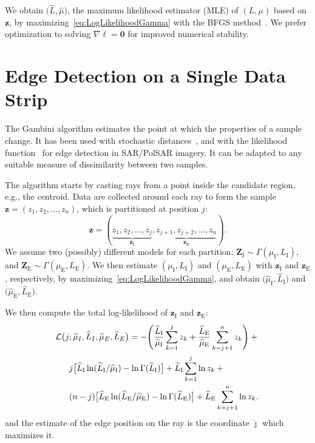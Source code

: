 \documentclass[journal]{IEEEtran}
\begin{document}
We obtain $\big(\widehat L, \widehat \mu\big)$, the maximum likelihood estimator (MLE) of $(L, \mu)$ based on $\bm z$, by maximizing~\eqref{eq:LogLikelihoodGamma} with the BFGS method~\cite{ht}.
We prefer optimization to solving $\nabla\ell=\bm 0$ for improved numerical stability.

\section{Edge Detection on a Single Data Strip}\label{sec_03}

The Gambini algorithm estimates the point at which the properties of a sample change.
It has been used with stochastic distances~\cite{nhfc}, and with the likelihood function~\cite{gmbf, fbgm} for edge detection in SAR/PolSAR imagery.
It can be adapted to any suitable measure of dissimilarity between two samples.

The algorithm starts by casting rays from a point inside the candidate region, e.g., the centroid.
Data are collected around each ray to form the sample $\bm z = (z_1,z_2,\dots,z_n)$, which is partitioned at position $j$:
$$
\bm z = (\underbrace{z_1,z_2,\dots,z_j}_{\bm z_\text{I}}, 
\underbrace{z_{j+1}, z_{j+2},\dots,z_n}_{\bm z_\text{E}}).
$$
We assume two (possibly) different models for each partition:
$\bm Z_\text{I} \sim \Gamma(\mu_\text{I},L_\text{I})$, and 
$\bm Z_\text{E} \sim \Gamma(\mu_\text{E},L_\text{E})$.
We then estimate $(\mu_\text{I},L_\text{I})$ and $(\mu_\text{E},L_\text{E})$ with $\bm z_\text{I}$ and $\bm z_\text{E}$, respectively, by maximizing~\eqref{eq:LogLikelihoodGamma}, and obtain $\big(\widehat{\mu}_\text{I}, \widehat{L}_\text{I}\big)$ and $\big(\widehat{\mu}_\text{E}, \widehat{L}_\text{E}\big)$.

We then compute the total log-likelihood of $\bm z_\text{I}$ and $\bm z_\text{E}$:
\begin{equation}\label{eq:TotalLogLikelihood}
\begin{aligned}
\mathcal L\big(j&;\widehat{\mu}_I, \widehat{L}_I,\widehat{\mu}_E, \widehat{L}_E\big)= -\Bigg(
	\frac{\widehat{L}_\text{I}}{\widehat{\mu}_\text{I}}\sum_{k=1}^{j} z_k +
	\frac{\widehat{L}_\text{E}}{\widehat{\mu}_\text{E}}\sum_{k=j+1}^{n} z_k  
	\Bigg)+\mbox{}\\
&j \big[\widehat{L}_\text{I}\ln (\widehat{L}_\text{I} / \widehat{\mu}_\text{I}) - \ln \Gamma(\widehat{L}_\text{I})\big]
+\widehat{L}_\text{I} \sum_{k=1}^{j}\ln z_k + \mbox{}\\
&(n-j) \big[\widehat{L}_\text{E}\ln (\widehat{L}_\text{E} / \widehat{\mu}_\text{E}) - \ln \Gamma(\widehat{L}_\text{E})\big]
+\widehat{L}_\text{E} \sum_{k=j+1}^{n}\ln z_k .%
\raisetag{2.2em}
\end{aligned}
\end{equation}
and the estimate of the edge position on the ray is the coordinate $\widehat\jmath$ which maximizes it.
\end{document}
